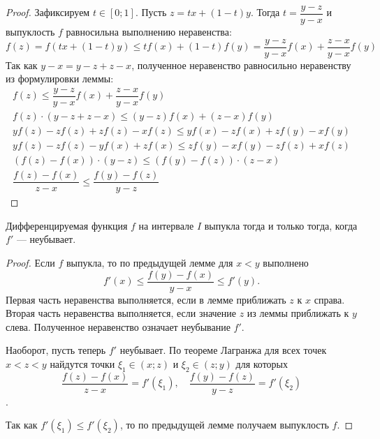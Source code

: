 \documentclass[a4paper]{article}
\theoremstyle{named}
\begin{document}
        \begin{proof}
            Зафиксируем $t \in [0; 1]$. Пусть $z = tx + (1 - t)y$. Тогда $t = \dfrac{y - z}{y - x}$ и выпуклость $f$ равносильна выполнению неравенства:
            \begin{equation*}
                f(z) = f(tx + (1 - t)y) \leq tf(x) + (1 - t)f(y) = \dfrac{y - z}{y - x}f(x) + \dfrac{z - x}{y - x}f(y)
            \end{equation*}
            Так как $y - x = y - z + z - x$, полученное неравенство равносильно неравенству из формулировки леммы:
            \[\begin{gathered}
                f(z) \leq \dfrac{y - z}{y - x}f(x) + \dfrac{z - x}{y - x}f(y) \\
                f(z) \cdot (y - z + z - x) \leq (y - z)f(x) + (z - x) f(y) \\
                yf(z) - zf(z) + zf(z) - xf(z) \leq yf(x) - zf(x) + zf(y) - xf(y) \\
                yf(z) - zf(z) -yf(x) + zf(x) \leq zf(y) - xf(y) - zf(z) + xf(z) \\
                (f(z) - f(x)) \cdot (y - z) \leq (f(y) - f(z)) \cdot (z - x) \\
                \dfrac{f(z) - f(x)}{z - x} \leq \dfrac{f(y) - f(z)}{y - z}
            \end{gathered}\]
        \end{proof}

        \begin{theorem*}
            Дифференцируемая функция $f$ на интервале $I$ выпукла тогда и только тогда, когда $f'$ --- неубывает.
        \end{theorem*}

        \begin{proof}
            Если $f$ выпукла, то по предыдущей лемме для $x < y$ выполнено
            \begin{equation*}
                f'(x) \leq \dfrac{f(y) - f(x)}{y - x} \leq f'(y).
            \end{equation*}
            Первая часть неравенства выполняется, если в лемме приближать $z$ к $x$ справа. Вторая часть неравенства выполняется, если значение $z$ из леммы приближать к $y$ слева. Полученное неравенство означает неубывание $f'$.

            Наоборот, пусть теперь $f'$ неубывает. По теореме Лагранжа для всех точек $x < z < y$ найдутся точки $\xi_1 \in (x; z)$ и $\xi_2 \in (z; y)$ для которых
            \begin{equation*}
                \dfrac{f(z) - f(x)}{z - x} = f'(\xi_1), \quad
                \dfrac{f(y) - f(z)}{y - z} = f'(\xi_2)
            \end{equation*}.

            Так как $f'(\xi_1) \leq f'(\xi_2)$, то по предыдущей лемме получаем выпуклость $f$.
        \end{proof}
\end{document}
